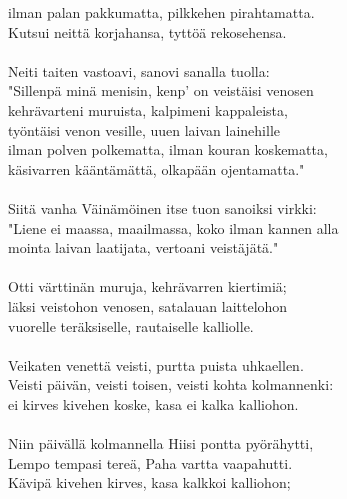 ilman palan pakkumatta, pilkkehen pirahtamatta.                 \\
Kutsui neittä korjahansa, tyttöä rekosehensa.                   \\
                                                                \\
Neiti taiten vastoavi, sanovi sanalla tuolla:                   \\
"Sillenpä minä menisin, kenp' on veistäisi venosen              \\
kehrävarteni muruista, kalpimeni kappaleista,                   \\
työntäisi venon vesille, uuen laivan lainehille                 \\
ilman polven polkematta, ilman kouran koskematta,               \\
käsivarren kääntämättä, olkapään ojentamatta."                  \\
                                                                \\
Siitä vanha Väinämöinen itse tuon sanoiksi virkki:              \\
"Liene ei maassa, maailmassa, koko ilman kannen alla            \\
mointa laivan laatijata, vertoani veistäjätä."                  \\
                                                                \\
Otti värttinän muruja, kehrävarren kiertimiä;                   \\
läksi veistohon venosen, satalauan laittelohon                  \\
vuorelle teräksiselle, rautaiselle kalliolle.                   \\
                                                                \\
Veikaten venettä veisti, purtta puista uhkaellen.               \\
Veisti päivän, veisti toisen, veisti kohta kolmannenki:         \\
ei kirves kivehen koske, kasa ei kalka kalliohon.               \\
                                                                \\
Niin päivällä kolmannella Hiisi pontta pyörähytti,              \\
Lempo tempasi tereä, Paha vartta vaapahutti.                    \\
Kävipä kivehen kirves, kasa kalkkoi kalliohon;                  \\
